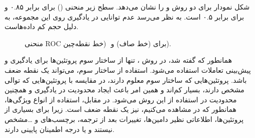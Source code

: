 شکل  نمودار  برای دو روش  و  را نشان می‌دهد. سطح زیر منحنی () برای  برابر ۰.۸۵ و برای  برابر ۰.۵ است. به نظر می‌رسد عدم توانایی  در یادگیری روی این مجموعه، به دلیل حجم کم داده‌هاست. 

\begin{figure}[ht]
\caption{
منحنی 
‫{‬ROC‫}‬
برای 
 (خط صاف) و ‬
‫(‬خط نقطه‌چین).
}
\label{fig:roc-curve}
\end{figure}

همانطور که گفته شد، در روش ، تنها از ساختار سوم پروتئین‌ها برای یادگیری و پیش‌بینی تعاملات استفاده می‌شود. استفاده از ساختار سوم، می‌تواند یک نقطه ضعف باشد. پروتئین‌هایی که ساختار سوم معلوم دارند، در مقایسه با پروتئین‌هایی که توالی مشخص دارند، بسیار کم‌اند و همین امر باعث ایجاد محدودیت در یادگیری و همچنین محدودیت در استفاده از این روش می‌شود. در مقابل، استفاده از انواع ویژگی‌ها، همانطور که در  مشاهده می‌کنیم، نیز یک نقطه ضعف است. زیرا برای بسیاری از پروتئین‌ها، اطلاعاتی نظیر دامین‌ها، تغییرات بعد از ترجمه، برچسب‌های  و \ldots مشخص نیستند و یا درجه اطمینان پایینی دارند.

